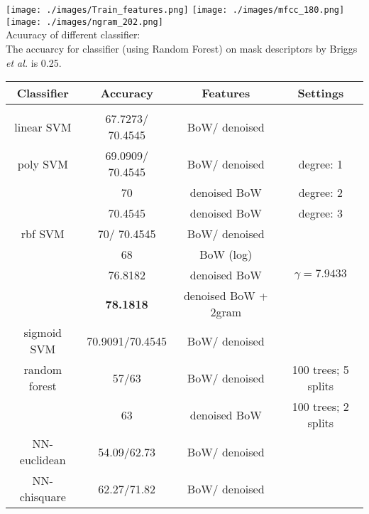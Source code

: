 \footnotesize
\texttt{[image: ./images/Train\_features.png]}
\texttt{[image: ./images/mfcc\_180.png]}
\texttt{[image: ./images/ngram\_202.png]}\\
\footnotesize
Acuuracy of different classifier: \\
The accuarcy for classifier (using Random Forest) on mask descriptors by Briggs \emph{et al.} is 0.25. 


\begin{tabular}{cccc}
\multicolumn{1}{c}{\bf Classifier }&\multicolumn{1}{c}{\bf Accuracy}  &\multicolumn{1}{c}{\bf Features} &\multicolumn{1}{c}{\bf Settings}
\\ \hline \\
linear SVM		&67.7273/ 70.4545 		&BoW/ denoised 		&  \\
poly SVM		&69.0909/ 70.4545  	&BoW/ denoised  	& degree: 1  \\
			& 70 			& denoised BoW 	& degree: 2  \\
			& 70.4545  	& denoised BoW 	& degree: 3  \\
rbf SVM       	&70/ 	70.4545  	&BoW/ denoised 		&  \\
                     	&68  			&  BoW (log) 	&  \\
          		&76.8182  		&  denoised BoW 	&  $\gamma = 7.9433$ \\
          		&{\bf 78.1818}  	&  denoised BoW + 2gram 	&    \\
sigmoid SVM     	&70.9091/70.4545	&BoW/ denoised 		&  \\
random forest    	&57/63 			& BoW/ denoised 	& 100 trees; 5 splits \\
       			&63  			& denoised BoW 	& 100 trees; 2 splits \\
NN-euclidean   	&54.09/62.73		& BoW/ denoised 	&  \\
NN-chisquare	&62.27/71.82		& BoW/ denoised 	&  \\

\end{tabular}


